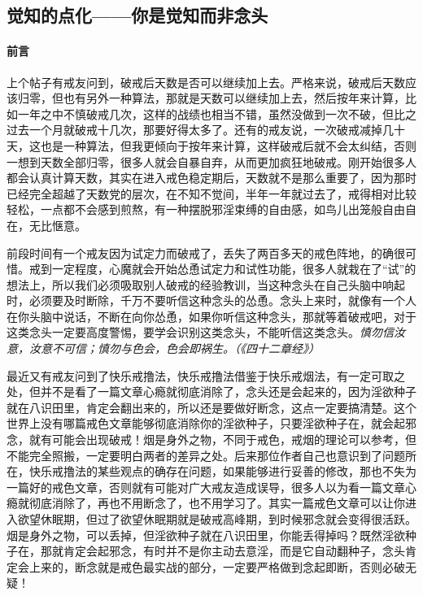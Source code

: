 \subsection{觉知的点化——你是觉知而非念头}\label{90}

\paragraph*{前言}

上个帖子有戒友问到，破戒后天数是否可以继续加上去。严格来说，破戒后天数应该归零，但也有另外一种算法，那就是天数可以继续加上去，然后按年来计算，比如一年之中不慎破戒几次，这样的战绩也相当不错，虽然没做到一次不破，但比之过去一个月就破戒十几次，那要好得太多了。还有的戒友说，一次破戒减掉几十天，这也是一种算法，但我更倾向于按年来计算，这样破戒后就不会太纠结，否则一想到天数全部归零，很多人就会自暴自弃，从而更加疯狂地破戒。刚开始很多人都会认真计算天数，其实在进入戒色稳定期后，天数就不是那么重要了，因为那时已经完全超越了天数党的层次，在不知不觉间，半年一年就过去了，戒得相对比较轻松，一点都不会感到煎熬，有一种摆脱邪淫束缚的自由感，如鸟儿出笼般自由自在，无比惬意。

前段时间有一个戒友因为试定力而破戒了，丢失了两百多天的戒色阵地，的确很可惜。戒到一定程度，心魔就会开始怂恿试定力和试性功能，很多人就栽在了“试”的想法上，所以我们必须吸取别人破戒的经验教训，当这种念头在自己头脑中响起时，必须要及时断除，千万不要听信这种念头的怂恿。念头上来时，就像有一个人在你头脑中说话，不断在向你怂恿，如果你听信这种念头，那就等着破戒吧，对于这类念头一定要高度警惕，要学会识别这类念头，不能听信这类念头。\textit{慎勿信汝意，汝意不可信；慎勿与色会，色会即祸生。（《四十二章经》）}

最近又有戒友问到了快乐戒撸法，快乐戒撸法借鉴于快乐戒烟法，有一定可取之处，但并不是看了一篇文章心瘾就彻底消除了，念头还是会起来的，因为淫欲种子就在八识田里，肯定会翻出来的，所以还是要做好断念，这点一定要搞清楚。这个世界上没有哪篇戒色文章能够彻底消除你的淫欲种子，只要淫欲种子在，就会起邪念，就有可能会出现破戒！烟是身外之物，不同于戒色，戒烟的理论可以参考，但不能完全照搬，一定要明白两者的差异之处。后来那位作者自己也意识到了问题所在，快乐戒撸法的某些观点的确存在问题，如果能够进行妥善的修改，那也不失为一篇好的戒色文章，否则就有可能对广大戒友造成误导，很多人以为看一篇文章心瘾就彻底消除了，再也不用断念了，也不用学习了。其实一篇戒色文章可以让你进入欲望休眠期，但过了欲望休眠期就是破戒高峰期，到时候邪念就会变得很活跃。烟是身外之物，可以丢掉，但淫欲种子就在八识田里，你能丢得掉吗？既然淫欲种子在，那就肯定会起邪念，有时并不是你主动去意淫，而是它自动翻种子，念头肯定会上来的，断念就是戒色最实战的部分，一定要严格做到念起即断，否则必破无疑！

